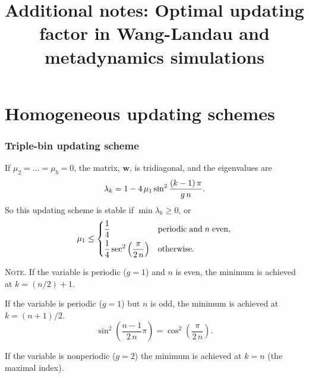 \documentclass[preprint, floatfix]{revtex4-1}
\newcommand{\note}[1]{{\color{DarkGreen}\footnotesize \textsc{Note.} #1}}
\begin{document}
\title{Additional notes: Optimal updating factor in Wang-Landau and metadynamics simulations}

\section{Homogeneous updating schemes}
\subsubsection{\label{sec:nnscheme}
Triple-bin updating scheme}



If $\mu_2 = \dots = \mu_b = 0$,
the matrix, $\mathbf w$, is tridiagonal,
and the eigenvalues are
\begin{equation}
  \lambda_k
  =
  1 -
  4 \, \mu_1 \sin^2
  \frac{ (k - 1) \, \pi }
       {       g \, n   }
  .
\notag
\end{equation}
%
So this updating scheme is stable if
$\min \lambda_k \ge 0$,
or
\begin{equation}
  \mu_1 \le
  \begin{dcases}
    \frac 1 4
    & \mathrm{periodic \; and \;} n \mathrm{ \; even,}
    \\
    \frac 1 4
    \sec^2
    \left( \frac{  \pi   }
                { 2 \, n }
    \right)
    & \mathrm{otherwise}.
  \end{dcases}
\notag
\end{equation}

\note{
If the variable is periodic ($g = 1$) and $n$ is even,
the minimum is achieved at $k = (n/2) + 1$.

If the variable is periodic ($g = 1$) but $n$ is odd,
the minimum is achieved at $k = (n+1)/2$.
$$
\sin^2\left(
  \frac{n-1}{2 \, n} \pi
\right)
=
\cos^2\left(
  \frac{\pi}{2 \, n}
\right)
.
$$

If the variable is nonperiodic ($g = 2$)
the minimum is achieved at $k = n$ (the maximal index).
}
\end{document}

